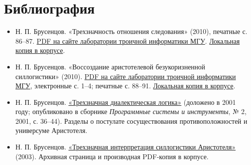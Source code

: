 \documentclass[12pt,a4paper]{article}
\begin{document}
\section{Библиография}

\begin{itemize}
\item Н. П. Брусенцов. «Трехзначность отношения следования» (2010), печатные с. 86–87. \href{https://ternarycomp.cs.msu.ru/Papers/brusentsov_sborn2010_1.pdf}{PDF на сайте лаборатории троичной информатики МГУ}. \href{../sources/pdfs/Брусенцов_Трехзначность-отношения-следования_2010.pdf}{Локальная копия в корпусе}.
\item Н. П. Брусенцов. «Воссоздание аристотелевой безукоризненной силлогистики» (2010). \href{https://ternarycomp.cs.msu.ru/Papers/brusentsov_sborn2010_2.pdf}{PDF на сайте лаборатории троичной информатики МГУ}, электронные с. 1–4; печатные с. 88–91. \href{../sources/pdfs/Брусенцов_Воссоздание-аристотелевой-силлогистики_2010.pdf}{Локальная копия в корпусе}.
\item Н. П. Брусенцов. \href{https://www.computer-museum.ru/histussr/trilog11.htm}{«Трехзначная диалектическая логика»} (доложено в 2001 году; опубликовано в сборнике \emph{Программные системы и инструменты}, № 2, 2001, с. 36–44). Разделы о постулате сосуществования противоположностей и универсуме Аристотеля.
\item Н. П. Брусенцов. \href{https://computer-museum.ru/histussr/trilog0.htm}{«Трехзначная интерпретация силлогистики Аристотеля»} (2003). Архивная страница и производная PDF-копия в корпусе.
\end{itemize}
\end{document}

